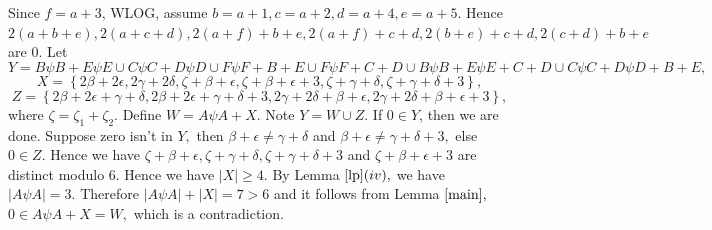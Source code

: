 \documentclass[reqno,10pt]{amsart}
\newtheorem{remar}[prop]{Remark}
\begin{document}
   Since $f=a+3$,  WLOG, assume $b=a+1,c=a+2,d=a+4,e=a+5.$ Hence $2(a+b+e),2(a+c+d),2(a+f)+b+e,2(a+f)+c+d,2(b+e)+c+d,2(c+d)+b+e$ are $0.$ Let
 $$ Y =  B \psi B + E \psi E \cup  C \psi C + D \psi D \cup
 F \psi F + B + E \cup F \psi F + C + D  \cup B \psi B + E \psi E + C + D \cup C \psi C + D \psi D + B + E,$$
$$ X = \left\lbrace 2\beta+2\epsilon , 2\gamma+2\delta , \zeta+\beta+\epsilon, \zeta+\beta+\epsilon+3 , \zeta+\gamma+\delta,\zeta+\gamma+\delta+3 \right\rbrace,$$
$$ Z =      
    \left\lbrace 2\beta + 2 \epsilon + \gamma + \delta , 2\beta + 2 \epsilon + \gamma + \delta +3 ,
     2\gamma + 2 \delta  + \beta + \epsilon , 2\gamma + 2 \delta  + \beta + \epsilon+3 \right\rbrace,$$
where $ \zeta = \zeta_1 + \zeta_2.$
Define $ W = A \psi A + X.$ Note $ Y = W \cup Z.$
If $0 \in  Y$, then we are done. Suppose zero isn't in $Y,$ then  $\beta+\epsilon \neq \gamma+\delta $ and $\beta+\epsilon \neq \gamma+\delta+3 ,$ else  $ 0 \in Z.$ Hence we have $\zeta+\beta+\epsilon, \zeta+\gamma+\delta,\zeta+\gamma+\delta+3$  and $\zeta+\beta+\epsilon+3$ are distinct modulo 6. Hence we have $|X| \geq 4. $  By Lemma $\ref{lp} (iv),$ we have $ |A \psi A| = 3.$ Therefore $|A \psi A| + |X| = 7 >6$ and it follows from Lemma $\ref{main},$  $0 \in A \psi A + X = W,$ which is a contradiction. 
\end{document}
